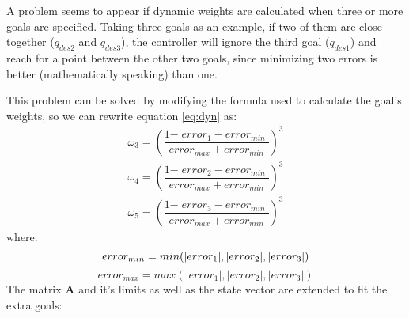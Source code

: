 A problem seems to appear if dynamic weights are calculated when three or more goals are specified. Taking three goals as an example, if two of them are close together ($q_{des2}$ and $q_{des3}$), the controller will ignore the third goal ($q_{des1}$) and reach for a point between the other two goals, since minimizing two errors is better (mathematically speaking) than one.

This problem can be solved by modifying the formula used to calculate the goal's weights, so we can rewrite equation \ref{eq:dyn} as:
\begin{subequations}
	\begin{align}
		\omega_3 = \left(\dfrac{1 - \rvert error_1 - error_{min} \rvert}{error_{max} + error_{min}}\right)^{3} \\
		\omega_4 = \left(\dfrac{1 - \rvert error_2 - error_{min} \rvert}{error_{max} + error_{min}}\right)^{3} \\
		\omega_5 = \left(\dfrac{1 - \rvert error_3 - error_{min} \rvert}{error_{max} + error_{min}}\right)^{3} 
	\end{align}
\end{subequations}
where:
$$error_{min} = min(\rvert error_1\rvert, \rvert error_2\rvert, \rvert error_3\rvert)\vspace{-10pt}$$ 
$$error_{max} = max(\rvert error_1\rvert, \rvert error_2\rvert, \rvert error_3\rvert)$$
The matrix \textbf{A} and it's limits as well as the state vector are extended to fit the extra goals:

